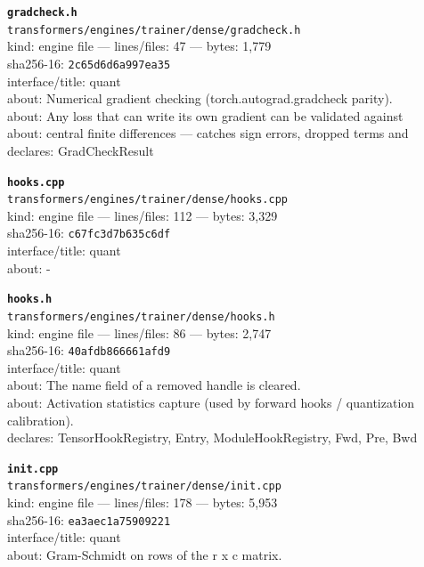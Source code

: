 \noindent\textbf{\texttt{gradcheck.h}}\\
\texttt{transformers/engines/trainer/dense/gradcheck.h}\\
kind: engine file --- lines/files: 47 --- bytes: 1,779\\
sha256-16: \texttt{2c65d6d6a997ea35}\\
interface/title: quant\\
about: Numerical gradient checking (torch.autograd.gradcheck parity).\\
about: Any loss that can write its own gradient can be validated against\\
about: central finite differences — catches sign errors, dropped terms and\\
declares: GradCheckResult\\
\vspace*{6.0pt}
\newpage

\noindent\textbf{\texttt{hooks.cpp}}\\
\texttt{transformers/engines/trainer/dense/hooks.cpp}\\
kind: engine file --- lines/files: 112 --- bytes: 3,329\\
sha256-16: \texttt{c67fc3d7b635c6df}\\
interface/title: quant\\
about: -\\
\vspace*{6.0pt}

\noindent\textbf{\texttt{hooks.h}}\\
\texttt{transformers/engines/trainer/dense/hooks.h}\\
kind: engine file --- lines/files: 86 --- bytes: 2,747\\
sha256-16: \texttt{40afdb866661afd9}\\
interface/title: quant\\
about: The name field of a removed handle is cleared.\\
about: Activation statistics capture (used by forward hooks / quantization calibration).\\
declares: TensorHookRegistry, Entry, ModuleHookRegistry, Fwd, Pre, Bwd\\
\vspace*{6.0pt}

\noindent\textbf{\texttt{init.cpp}}\\
\texttt{transformers/engines/trainer/dense/init.cpp}\\
kind: engine file --- lines/files: 178 --- bytes: 5,953\\
sha256-16: \texttt{ea3aec1a75909221}\\
interface/title: quant\\
about: Gram-Schmidt on rows of the r x c matrix.\\
\vspace*{6.0pt}

